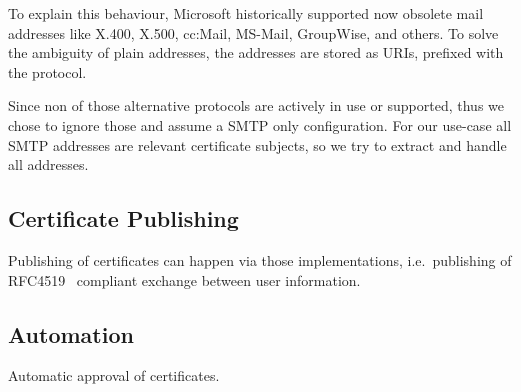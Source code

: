To explain this behaviour, Microsoft historically supported now obsolete mail addresses like X.400, X.500, cc:Mail,
MS-Mail, GroupWise, and others.
To solve the ambiguity of plain addresses, the addresses are stored as URIs\cite{RFC3986}, prefixed with the protocol.

Since non of those alternative protocols are actively in use or supported, thus we chose to ignore those and assume a
SMTP only configuration.
For our use-case all SMTP addresses are relevant certificate subjects, so we try to extract and handle all addresses.

\subsection*{Certificate Publishing}
Publishing of certificates can happen via those implementations, i.e.\ publishing of RFC4519~\cite{RFC4519} compliant
exchange between user information.

\subsection*{Automation}
Automatic approval of certificates.
